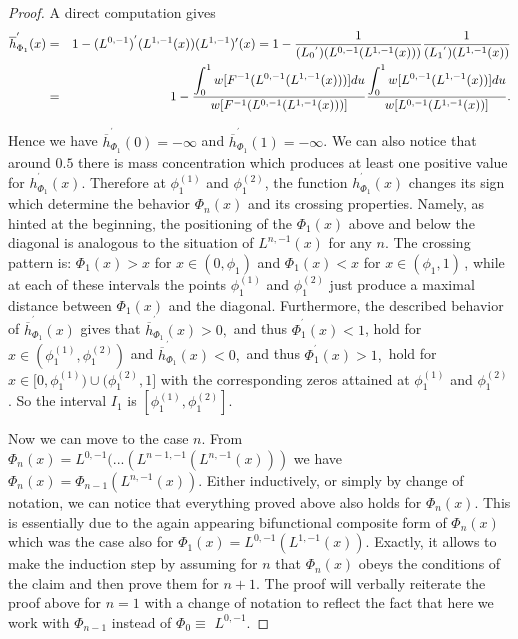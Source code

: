 \documentclass[10pt,a4paper]{amsart}
\providecommand{\dint}{\displaystyle\int}
\begin{document}
\begin{proof}
A direct computation gives%
\begin{eqnarray}
\overline{h}_{\Phi _{1}}^{^{\prime }}(x) &=&1-(L^{0,-1})^{^{\prime
}}(L^{1,-1}(x))(L^{1,-1})^{\prime }(x)=1-\frac{1}{(L_{0}{}^{^{\prime
}})(L^{0,-1}(L^{1,-1}(x)))}\frac{1}{(L_{1}{}^{^{\prime }})(L^{1,-1}(x))} 
\notag \\
&=&1-\frac{\dint\nolimits_{0}^{1}w[F^{-1}(L^{0,-1}(L^{1,-1}(x)))]du}{%
w[F^{-1}(L^{0,-1}(L^{1,-1}(x)))]}\frac{\dint%
\nolimits_{0}^{1}w[L^{0,-1}(L^{1,-1}(x))]du}{w[L^{0,-1}(L^{1,-1}(x))]}.
\label{175.1}
\end{eqnarray}

Hence we have $\overline{h}_{\Phi _{1}}^{^{\prime }}(0)=-\infty $ and $%
\overline{h}_{\Phi _{1}}^{^{\prime }}(1)=-\infty $. We can also notice that
around $0.5$ there is mass concentration which produces at least one
positive value for $h_{\Phi _{1}}^{^{\prime }}(x)$. Therefore at $\phi
_{1}^{(1)}$ and $\phi _{1}^{(2)}$, the function $h_{\Phi _{1}}^{^{\prime
}}(x)$ changes its sign which determine the behavior $\Phi _{n}(x)$ and its
crossing properties. Namely, as hinted at the beginning, the positioning of
the $\Phi _{1}(x)$ above and below the diagonal is analogous to the
situation of $L^{n,-1}(x)$ for any $n$. The crossing pattern is: $\Phi
_{1}(x)>x$ for $x\in (0,\phi _{1})$ and $\Phi _{1}(x)<x$ for $x\in (\phi
_{1},1)\,$, while at each of these intervals the points $\phi _{1}^{(1)}$
and $\phi _{1}^{(2)}$ just produce a maximal distance between $\Phi _{1}(x)$
and the diagonal. Furthermore, the described behavior of $\overline{h}_{\Phi
_{1}}^{^{\prime }}(x)$ gives that $\overline{h}_{\Phi _{1}}^{^{\prime
}}(x)>0,$ and thus $\Phi _{1}^{^{\prime }}(x)<1$, hold for $x\in (\phi
_{1}^{(1)},\phi _{1}^{(2)})$ and $\overline{h}_{\Phi _{1}}^{^{\prime
}}(x)<0, $ and thus $\Phi _{1}^{^{\prime }}(x)>1,$ hold for $x\in \lbrack
0,\phi _{1}^{(1)})\cup (\phi _{1}^{(2)},1]$ with the corresponding zeros
attained at $\phi _{1}^{(1)}$ and $\phi _{1}^{(2)}$. So the interval $I_{1}$
is $[\phi _{1}^{(1)},\phi _{1}^{(2)}]$.

Now we can move to the case $n$. From $\Phi
_{n}(x)=L^{0,-1}(...(L^{n-1,-1}(L^{n,-1}(x)))$ we have $\Phi _{n}(x)=\Phi
_{n-1}(L^{n,-1}(x))$. Either inductively, or simply by change of notation,
we can notice that everything proved above also holds for $\Phi _{n}(x)$.
This is essentially due to the again appearing bifunctional composite form
of $\Phi _{n}(x)$ which was the case also for $\Phi
_{1}(x)=L^{0,-1}(L^{1,-1}(x))$. Exactly, it allows to make the induction
step by assuming for $n$ that $\Phi _{n}(x)$ obeys the conditions of the
claim and then prove them for $n+1$. The proof will verbally reiterate the
proof above for $n=1$ with a change of notation to reflect the fact that
here we work with $\Phi _{n-1}$ instead of $\Phi _{0}\equiv $ $L^{0,-1}$.


\end{proof}
\end{document}

